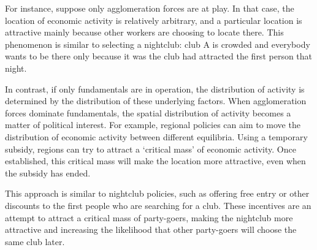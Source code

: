 \documentclass[
  12pt,
  oneside]{book}
\theoremstyle{definition}
\theoremstyle{definition}
\theoremstyle{definition}
\theoremstyle{definition}
\theoremstyle{remark}
\begin{document}
For instance, suppose only agglomeration forces are at play. In that case, the location of economic activity is relatively arbitrary, and a particular location is attractive mainly because other workers are choosing to locate there. This phenomenon is similar to selecting a nightclub: club A is crowded and everybody wants to be there only because it was the club had attracted the first person that night.

In contrast, if only fundamentals are in operation, the distribution of activity is determined by the distribution of these underlying factors. When agglomeration forces dominate fundamentals, the spatial distribution of activity becomes a matter of political interest. For example, regional policies can aim to move the distribution of economic activity between different equilibria. Using a temporary subsidy, regions can try to attract a `critical mass' of economic activity. Once established, this critical mass will make the location more attractive, even when the subsidy has ended.

This approach is similar to nightclub policies, such as offering free entry or other discounts to the first people who are searching for a club. These incentives are an attempt to attract a critical mass of party-goers, making the nightclub more attractive and increasing the likelihood that other party-goers will choose the same club later.
\end{document}
